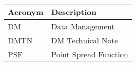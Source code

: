 \addtocounter{table}{-1}
\begin{longtable}{p{}p{}}\hline
\textbf{Acronym} & \textbf{Description}  \\\hline

DM & Data Management \\\hline
DMTN & DM Technical Note \\\hline
PSF & Point Spread Function \\\hline
\end{longtable}
